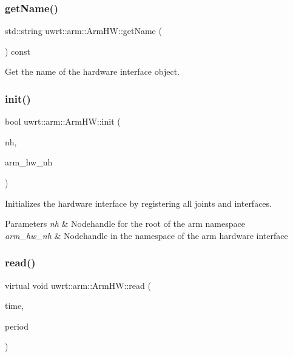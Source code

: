 \subsubsection{\texorpdfstring{get\+Name()}{getName()}}
{\footnotesize\ttfamily std\+::string uwrt\+::arm\+::\+Arm\+H\+W\+::get\+Name (\begin{DoxyParamCaption}{ }\end{DoxyParamCaption}) const}



Get the name of the hardware interface object. 

\mbox{\label{classuwrt_1_1arm_1_1_arm_h_w_a2b8c89b8498c70d8b627fefd17267e40}} 
\subsubsection{\texorpdfstring{init()}{init()}}
{\footnotesize\ttfamily bool uwrt\+::arm\+::\+Arm\+H\+W\+::init (\begin{DoxyParamCaption}\item[{ros\+::\+Node\+Handle \&}]{nh,  }\item[{ros\+::\+Node\+Handle \&}]{arm\+\_\+hw\+\_\+nh }\end{DoxyParamCaption})\hspace{0.3cm}{\ttfamily [override]}}



Initializes the hardware interface by registering all joints and interfaces. 


\begin{DoxyParams}{Parameters}
{\em nh} & Nodehandle for the root of the arm namespace \\
\hline
{\em arm\+\_\+hw\+\_\+nh} & Nodehandle in the namespace of the arm hardware interface \\
\hline
\end{DoxyParams}
\mbox{\label{classuwrt_1_1arm_1_1_arm_h_w_af2164103badfa99373f787b8a3cecb6b}} 
\subsubsection{\texorpdfstring{read()}{read()}}
{\footnotesize\ttfamily virtual void uwrt\+::arm\+::\+Arm\+H\+W\+::read (\begin{DoxyParamCaption}\item[{const ros\+::\+Time \&}]{time,  }\item[{const ros\+::\+Duration \&}]{period }\end{DoxyParamCaption})\hspace{0.3cm}{\ttfamily [pure virtual]}}



